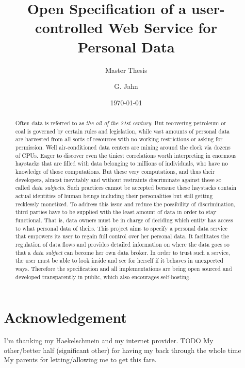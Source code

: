 \documentclass[12pt,english,a4paper,titlepage,cleardoublepage=empty,dottedtoc]{report}
\title{Open Specification of a user-controlled Web Service for Personal Data}
\subtitle{Master Thesis}
\author{G. Jahn}
\date{\today}
\begin{document}
\maketitle
\begin{abstract}
Often data is referred to as \emph{the oil of the 21st century}. But
recovering petroleum or coal is governed by certain rules and
legislation, while vast amounts of personal data are harvested from all
sorts of resources with no working restrictions or asking for
permission. Well air-conditioned data centers are mining around the
clock via dozens of CPUs. Eager to discover even the tiniest
correlations worth interpreting in enormous haystacks that are filled
with data belonging to millions of individuals, who have no knowledge of
those computations. But these very computations, and thus their
developers, almost inevitably and without restraints discriminate
against these so called \emph{data subjects}. Such practices cannot be
accepted because these haystacks contain actual identities of human
beings including their personalities but still getting recklessly
monetized. To address this issue and reduce the possibility of
discrimination, third parties have to be supplied with the least amount
of data in order to stay functional. That is, data owners must be in
charge of deciding which entity has access to what personal data of
theirs. This project aims to specify a personal data service that
empowers its user to regain full control over her personal data. It
facilitates the regulation of data flows and provides detailed
information on where the data goes so that a \emph{data subject} can
become her own data broker. In order to trust such a service, the user
must be able to look inside and see for herself if it behaves in
unexpected ways. Therefore the specification and all implementations are
being open sourced and developed transparently in public, which also
encourages self-hosting.
\end{abstract}

\section*{Acknowledgement}
I'm thanking my Haekelschmein and my internet provider. TODO My
other/better half (significant other) for having my back through the
whole time My parents for letting/allowing me to get this fare.
\newpage
\end{document}
